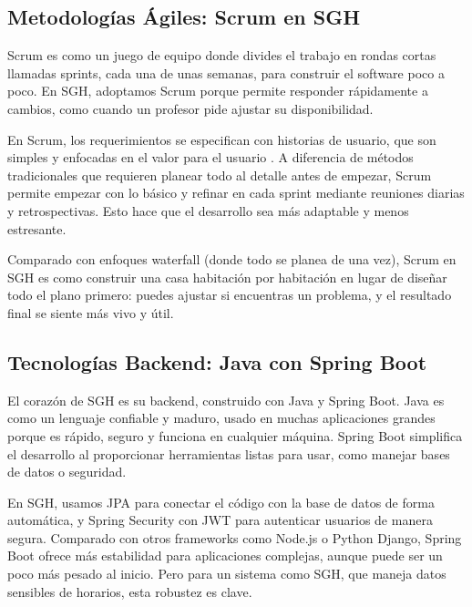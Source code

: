 \subsection{Metodologías Ágiles: Scrum en SGH}
Scrum es como un juego de equipo donde divides el trabajo en rondas cortas llamadas sprints, cada una de unas semanas, para construir el software poco a poco. En SGH, adoptamos Scrum porque permite responder rápidamente a cambios, como cuando un profesor pide ajustar su disponibilidad.

En Scrum, los requerimientos se especifican con historias de usuario, que son simples y enfocadas en el valor para el usuario \cite{izaurralde2013}. A diferencia de métodos tradicionales que requieren planear todo al detalle antes de empezar, Scrum permite empezar con lo básico y refinar en cada sprint mediante reuniones diarias y retrospectivas. Esto hace que el desarrollo sea más adaptable y menos estresante.

Comparado con enfoques waterfall (donde todo se planea de una vez), Scrum en SGH es como construir una casa habitación por habitación en lugar de diseñar todo el plano primero: puedes ajustar si encuentras un problema, y el resultado final se siente más vivo y útil.

\subsection{Tecnologías Backend: Java con Spring Boot}
El corazón de SGH es su backend, construido con Java y Spring Boot. Java es como un lenguaje confiable y maduro, usado en muchas aplicaciones grandes porque es rápido, seguro y funciona en cualquier máquina. Spring Boot simplifica el desarrollo al proporcionar herramientas listas para usar, como manejar bases de datos o seguridad.

En SGH, usamos JPA para conectar el código con la base de datos de forma automática, y Spring Security con JWT para autenticar usuarios de manera segura. Comparado con otros frameworks como Node.js o Python Django, Spring Boot ofrece más estabilidad para aplicaciones complejas, aunque puede ser un poco más pesado al inicio. Pero para un sistema como SGH, que maneja datos sensibles de horarios, esta robustez es clave.

